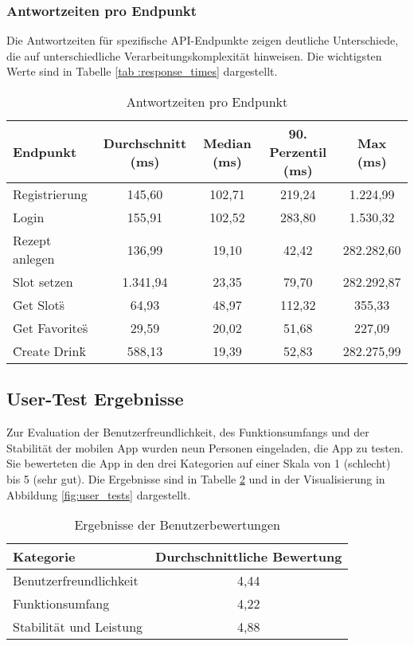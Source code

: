 \subsubsection*{Antwortzeiten pro Endpunkt}

Die Antwortzeiten für spezifische API-Endpunkte zeigen deutliche Unterschiede, die auf 
unterschiedliche Verarbeitungskomplexität hinweisen. Die wichtigsten Werte sind in Tabelle \ref{tab
:response_times} dargestellt.

\begin{table}[h!]
    \centering
    \begin{tabular}{|l|c|c|c|c|}
        \hline
        \textbf{Endpunkt} & \textbf{Durchschnitt (ms)} & \textbf{Median (ms)} & \textbf{90. Perzentil (ms)} & \textbf{Max (ms)} \\
        \hline
        Registrierung & 145,60 & 102,71 & 219,24 & 1.224,99 \\
        Login & 155,91 & 102,52 & 283,80 & 1.530,32 \\
        Rezept anlegen & 136,99 & 19,10 & 42,42 & 282.282,60 \\
        Slot setzen & 1.341,94 & 23,35 & 79,70 & 282.292,87 \\
        \"Get Slots\" & 64,93 & 48,97 & 112,32 & 355,33 \\
        \"Get Favorites\" & 29,59 & 20,02 & 51,68 & 227,09 \\
        \"Create Drink\" & 588,13 & 19,39 & 52,83 & 282.275,99 \\
        \hline
    \end{tabular}
    \caption{Antwortzeiten pro Endpunkt}
    \label{tab:response_times}
\end{table}

\subsection{User-Test Ergebnisse}

Zur Evaluation der Benutzerfreundlichkeit, des Funktionsumfangs und der Stabilität der mobilen App wurden neun Personen eingeladen, die App zu testen. Sie bewerteten die App in den drei Kategorien auf einer Skala von 1 (schlecht) bis 5 (sehr gut). Die Ergebnisse sind in Tabelle \ref{tab:user_tests} und in der Visualisierung in Abbildung \ref{fig:user_tests} dargestellt.

\begin{table}[h!]
    \centering
    \begin{tabular}{|l|c|}
        \hline
        \textbf{Kategorie} & \textbf{Durchschnittliche Bewertung} \\
        \hline
        Benutzerfreundlichkeit & 4,44 \\
        Funktionsumfang & 4,22 \\
        Stabilität und Leistung & 4,88 \\
        \hline
    \end{tabular}
    \caption{Ergebnisse der Benutzerbewertungen}
    \label{tab:user_tests}
\end{table}

